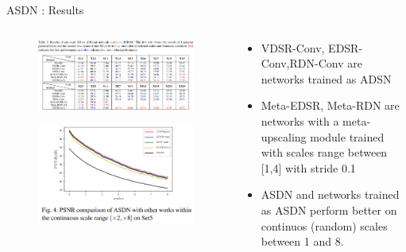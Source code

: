 \documentclass{beamer}
\begin{document}
\begin{frame}{ASDN : Results}
{\begin{columns}[onlytextwidth]
\begin{column}{0.5\textwidth}
\begin{figure}
                    \centering
                    \includegraphics[width=\textwidth, keepaspectratio]{asdn-table2.png}
                \end{figure}
                \begin{figure}
                    \centering
                    \includegraphics[width=\textwidth, keepaspectratio]{asdn-fig4.png}
                \end{figure}                    
            \end{column}
            \begin{column}{0.5\textwidth}
                \begin{center}
                    \begin{itemize}
                        \tiny
                        \item VDSR-Conv, EDSR-Conv,RDN-Conv are networks trained as ADSN
                        \item Meta-EDSR, Meta-RDN are networks with a meta-upscaling module trained with scales range between [1,4] with stride 0.1
                        \item ASDN and networks trained as ASDN perform better on continuos (random) scales between 1 and 8.

\end{itemize}
\end{center}
\end{column}
\end{columns}}
\end{frame}
\end{document}
